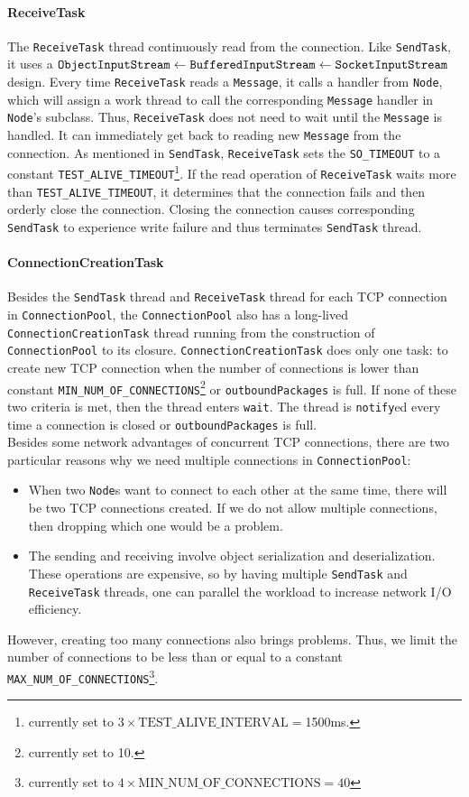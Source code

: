 \documentclass{article}
\numberwithin{equation}{section}
\begin{document}
\paragraph{ReceiveTask}The \verb|ReceiveTask| thread continuously read from the connection. Like \verb|SendTask|, it uses a $\verb|ObjectInputStream|\leftarrow\verb|BufferedInputStream|\leftarrow\verb|SocketInputStream|$ design. Every time \verb|ReceiveTask| reads a \verb|Message|, it calls a handler from \verb|Node|, which will assign a work thread to call the corresponding \verb|Message| handler in \verb|Node|'s subclass. Thus, \verb|ReceiveTask| does not need to wait until the \verb|Message| is handled. It can immediately get back to reading new \verb|Message| from the connection. As mentioned in \verb|SendTask|, \verb|ReceiveTask| sets the \verb|SO_TIMEOUT| to a constant \verb|TEST_ALIVE_TIMEOUT|\footnote{currently set to $3\times\text{TEST\_ALIVE\_INTERVAL}=$1500ms.}. If the read operation of \verb|ReceiveTask| waits more than \verb|TEST_ALIVE_TIMEOUT|, it determines that the connection fails and then orderly close the connection. Closing the connection causes corresponding \verb|SendTask| to experience write failure and thus terminates \verb|SendTask| thread.

\paragraph{ConnectionCreationTask}Besides the \verb|SendTask| thread and \verb|ReceiveTask| thread for each TCP connection in \verb|ConnectionPool|, the \verb|ConnectionPool| also has a long-lived \verb|ConnectionCreationTask| thread running from the construction of \verb|ConnectionPool| to its closure. \verb|ConnectionCreationTask| does only one task: to create new TCP connection when the number of connections is lower than constant \verb|MIN_NUM_OF_CONNECTIONS|\footnote{currently set to 10.} or \verb|outboundPackages| is full. If none of these two criteria is met, then the thread enters \verb|wait|. The thread is \verb|notify|ed every time a connection is closed or \verb|outboundPackages| is full.\\

Besides some network advantages of concurrent TCP connections, there are two particular reasons why we need multiple connections in \verb|ConnectionPool|:
\begin{itemize}
	\item When two \verb|Node|s want to connect to each other at the same time, there will be two TCP connections created. If we do not allow multiple connections, then dropping which one would be a problem.
	\item The sending and receiving involve object serialization and deserialization. These operations are expensive, so by having multiple \verb|SendTask| and \verb|ReceiveTask| threads, one can parallel the workload to increase network I/O efficiency.
\end{itemize}
However, creating too many connections also brings problems. Thus, we limit the number of connections to be less than or equal to a constant \verb|MAX_NUM_OF_CONNECTIONS|\footnote{currently set to $4\times\text{MIN\_NUM\_OF\_CONNECTIONS}=40$}.
\end{document}
